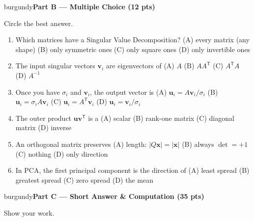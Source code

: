 \documentclass[10pt]{article}
\newcommand{\xx}{\mathbf{x}}
\newcommand{\vv}{\mathbf{v}}
\newcommand{\uu}{\mathbf{u}}
\newcommand{\T}{^{\mathsf T}}
\newcommand{\parthead}[1]{%
  \vspace{6pt}\noindent
  \begin{headlinebox}{burgundy}{\color{white}\bfseries #1}\end{headlinebox}%
  \vspace{4pt}}
\begin{document}
\parthead{Part B --- Multiple Choice (12 pts)}
Circle the best answer.

\begin{enumerate}[leftmargin=1.9em, itemsep=9pt]
  \item Which matrices have a Singular Value Decomposition?
    \hfill (A) every matrix (any shape) \quad (B) only symmetric ones \quad (C) only square ones \quad (D) only invertible ones
  \item The input singular vectors $\vv_i$ are eigenvectors of
    \hfill (A) $A$ \quad (B) $AA\T$ \quad (C) $A\T A$ \quad (D) $A^{-1}$
  \item Once you have $\sigma_i$ and $\vv_i$, the output vector is
    \hfill (A) $\uu_i=A\vv_i/\sigma_i$ \quad (B) $\uu_i=\sigma_i A\vv_i$ \quad (C) $\uu_i=A\T\vv_i$ \quad (D) $\uu_i=\vv_i/\sigma_i$
  \item The outer product $\uu\vv\T$ is a
    \hfill (A) scalar \quad (B) rank-one matrix \quad (C) diagonal matrix \quad (D) inverse
  \item An orthogonal matrix preserves
    \hfill (A) length: $|Q\xx|=|\xx|$ \quad (B) always $\det=+1$ \quad (C) nothing \quad (D) only direction
  \item In PCA, the first principal component is the direction of
    \hfill (A) least spread \quad (B) greatest spread \quad (C) zero spread \quad (D) the mean
\end{enumerate}

\parthead{Part C --- Short Answer \& Computation (35 pts)}
Show your work.
\end{document}
